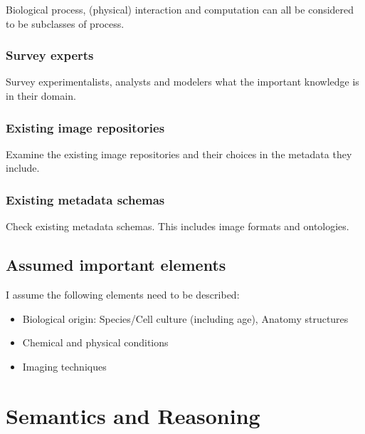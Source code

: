 Biological process, (physical) interaction and computation can all be
considered to be subclasses of process.

\subsubsection{Survey experts}

Survey experimentalists, analysts and modelers
what the important knowledge is in their domain.

\subsubsection{Existing image repositories}

Examine the existing image repositories and
their choices in the metadata they include.

\subsubsection{Existing metadata schemas}

Check existing metadata schemas. This includes
image formats and ontologies.

\subsection{Assumed important elements}

I assume the following elements need to be described:
\begin{itemize}
\item Biological origin:
  Species/Cell culture (including
  age), Anatomy structures
\item Chemical and physical conditions
\item Imaging techniques
\end{itemize}


\section{Semantics and Reasoning}

